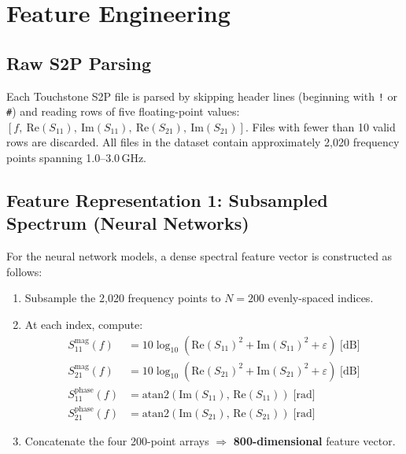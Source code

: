\documentclass[12pt, a4paper, oneside]{report}
\begin{document}
\chapter{Feature Engineering}
\label{ch:features}

\section{Raw S2P Parsing}

Each Touchstone S2P file is parsed by skipping header lines (beginning with \texttt{!} or \texttt{\#}) and reading rows of five floating-point values: $[f,\ \mathrm{Re}(S_{11}),\ \mathrm{Im}(S_{11}),\ \mathrm{Re}(S_{21}),\ \mathrm{Im}(S_{21})]$. Files with fewer than 10 valid rows are discarded. All files in the dataset contain approximately 2,020 frequency points spanning 1.0--3.0\,GHz.

\section{Feature Representation 1: Subsampled Spectrum (Neural Networks)}

For the neural network models, a dense spectral feature vector is constructed as follows:

\begin{enumerate}[noitemsep]
  \item Subsample the 2,020 frequency points to $N=200$ evenly-spaced indices.
  \item At each index, compute:
    \begin{align}
      S_{11}^{\mathrm{mag}}(f) &= 10\log_{10}\!\left(\mathrm{Re}(S_{11})^2 + \mathrm{Im}(S_{11})^2 + \varepsilon\right)\;\text{[dB]} \\
      S_{21}^{\mathrm{mag}}(f) &= 10\log_{10}\!\left(\mathrm{Re}(S_{21})^2 + \mathrm{Im}(S_{21})^2 + \varepsilon\right)\;\text{[dB]} \\
      S_{11}^{\mathrm{phase}}(f) &= \mathrm{atan2}\!\left(\mathrm{Im}(S_{11}),\,\mathrm{Re}(S_{11})\right)\;\text{[rad]} \\
      S_{21}^{\mathrm{phase}}(f) &= \mathrm{atan2}\!\left(\mathrm{Im}(S_{21}),\,\mathrm{Re}(S_{21})\right)\;\text{[rad]}
    \end{align}
  \item Concatenate the four 200-point arrays $\Rightarrow$ \textbf{800-dimensional} feature vector.
\end{enumerate}
\end{document}
